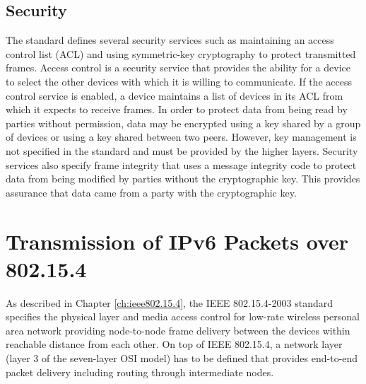 \documentclass[12pt, titlepage, a4paper]{report}
\begin{document}
\section{Security}
The standard defines several security services such as maintaining an access control list (ACL) and
using symmetric-key cryptography to protect transmitted frames. Access control is a security service that provides the ability for a device to select the other devices with which it is willing to communicate. If the access control service is enabled, a device maintains a list of devices in its ACL from which it expects to receive frames.                        In order to protect data from being read by parties without permission, data may be encrypted using a key shared by a group of devices or using a key shared between two peers. However, key management is not specified in the standard and must be provided by the higher layers. Security services also specify frame integrity that uses a message integrity code to protect data from being modified by parties without the cryptographic key. This provides assurance that data came from a party with the cryptographic key. 


\chapter{Transmission of IPv6 Packets over 802.15.4}\label{ch:6lowpan}
As described in Chapter \ref{ch:ieee802.15.4}, the IEEE 802.15.4-2003 standard specifies the physical layer and media access control for low-rate wireless personal area network providing node-to-node frame delivery between the devices within reachable distance from each other. On top of IEEE 802.15.4, a network layer (layer 3 of the seven-layer OSI model) has to be defined that provides end-to-end packet delivery including routing through intermediate nodes.

\end{document}

